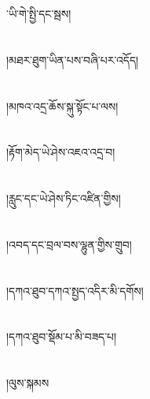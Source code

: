 ་ཡི་གེ་སྤྱི་དང་སྦས།\chapter{ }།མཐར་ཐུག་ཡིན་པས་བཞི་པར་འདོད།\chapter{ }།མཁའ་འདྲ་ཆོས་སྐུ་སྟོང་པ་ལས།\chapter{ }།རྟོག་མེད་ཡེ་ཤེས་འཇའ་འདྲ་བ།\chapter{ }།རླུང་དང་ཡེ་ཤེས་ཏིང་འཛིན་གྱིས།\chapter{ }།འབད་དང་བྲལ་བས་ལྷུན་གྱིས་གྲུབ།\chapter{ }།དཀའ་ཐུབ་དཀའ་སྤྱད་འདིར་མི་དགོས།\chapter{ }།དཀའ་ཐུབ་སྡོམ་པ་མི་བཟད་པ།\chapter{ }།ལུས་སྐམས
